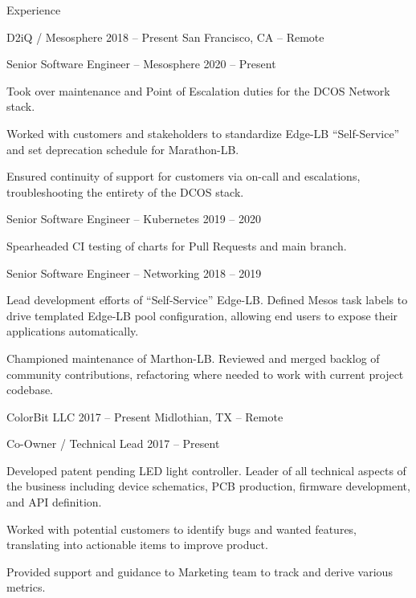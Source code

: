 \documentclass{resume}
\begin{document}
\begin{rSection}{Experience}

	\begin{rSubsection}{D2iQ / Mesosphere}
		{2018 -- Present} %
		{San Francisco, CA -- Remote} %
		\begin{rSubsubsection}{Senior Software Engineer -- Mesosphere} %
			{2020 -- Present} %
			{\small
		\item Took over maintenance and Point of Escalation duties for the DCOS
			Network stack.
		\item Worked with customers and stakeholders to standardize Edge-LB
			``Self-Service'' and set deprecation schedule for Marathon-LB\@.
		\item Ensured continuity of support for customers via on-call and
			escalations, troubleshooting the entirety of the DCOS stack.
			}
		\end{rSubsubsection}
		\begin{rSubsubsection}{Senior Software Engineer -- Kubernetes} %
			{2019 -- 2020} %
			{\small
		\item Spearheaded CI testing of charts for Pull Requests and main branch.
			}
		\end{rSubsubsection}
		\begin{rSubsubsection}{Senior Software Engineer -- Networking} %
			{2018 -- 2019} %
			{\small
		\item Lead development efforts of ``Self-Service'' Edge-LB\@. Defined Mesos
			task labels to drive templated Edge-LB pool configuration, allowing
			end users to expose their applications automatically.
		\item Championed maintenance of Marthon-LB\@. Reviewed and merged backlog of
			community contributions, refactoring where needed to work with current
			project codebase.
			}
		\end{rSubsubsection}
	\end{rSubsection}

	\begin{rSubsection}{ColorBit LLC}
		{2017 -- Present} %
		{Midlothian, TX -- Remote} %
		\begin{rSubsubsection}{Co-Owner / Technical Lead}
			{2017 -- Present} %
			{\small
		\item Developed patent pending LED light controller. Leader of all technical
			aspects of the business including device schematics, PCB production,
			firmware development, and API definition.
		\item Worked with potential customers to identify bugs and wanted features,
			translating into actionable items to improve product.
		\item Provided support and guidance to Marketing team to track and derive
			various metrics.
			}
		\end{rSubsubsection}
	\end{rSubsection}


\end{rSection}
\end{document}
